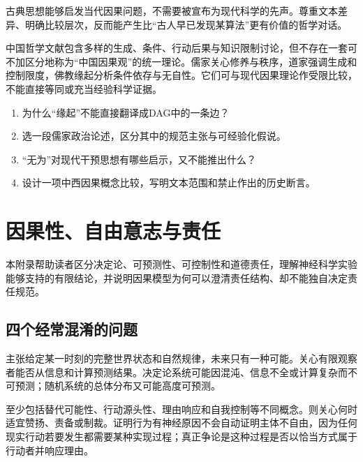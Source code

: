 \begin{keypoint}
古典思想能够启发当代因果问题，不需要被宣布为现代科学的先声。尊重文本差异、明确比较层次，反而能产生比“古人早已发现某算法”更有价值的哲学对话。
\end{keypoint}

\begin{chapterreview}
中国哲学文献包含多样的生成、条件、行动后果与知识限制讨论，但不存在一套可不加区分地称为“中国因果观”的统一理论。儒家关心修养与秩序，道家强调生成和控制限度，佛教缘起分析条件依存与无自性。它们可与现代因果理论作受限比较，不能直接等同或充当经验科学证据。
\end{chapterreview}

\begin{selfcheck}
\begin{enumerate}
  \item 为什么“缘起”不能直接翻译成DAG中的一条边？
  \item 选一段儒家政治论述，区分其中的规范主张与可经验化假说。
  \item “无为”对现代干预思想有哪些启示，又不能推出什么？
  \item 设计一项中西因果概念比较，写明文本范围和禁止作出的历史断言。
\end{enumerate}
\end{selfcheck}

\section{因果性、自由意志与责任}

\begin{learninggoals}
本附录帮助读者区分决定论、可预测性、可控制性和道德责任，理解神经科学实验能够支持的有限结论，并说明因果模型为何可以澄清责任结构、却不能独自决定责任规范。
\end{learninggoals}

\subsection{四个经常混淆的问题}

主张给定某一时刻的完整世界状态和自然规律，未来只有一种可能。关心有限观察者能否从信息和计算预测结果。决定论系统可能因混沌、信息不全或计算复杂而不可预测；随机系统的总体分布又可能高度可预测。

至少包括替代可能性、行动源头性、理由响应和自我控制等不同概念。则关心何时适宜赞扬、责备或制裁。证明行为有神经原因不会自动证明主体不自由，因为任何现实行动若要发生都需要某种实现过程；真正争论是这种过程是否以恰当方式属于行动者并响应理由。

